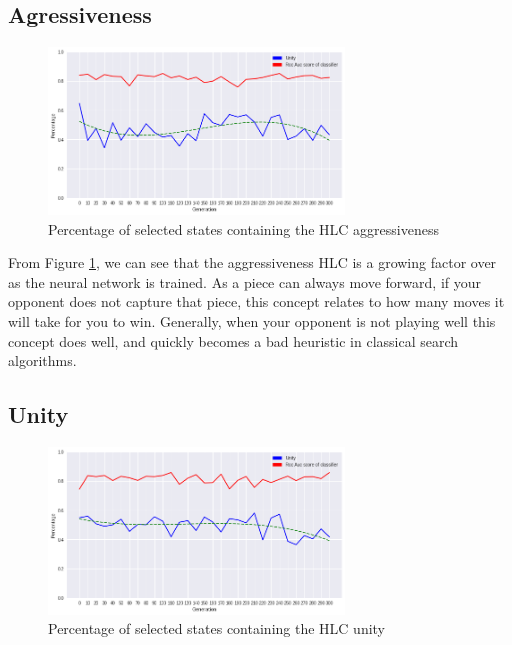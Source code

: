 \subsection{Agressiveness}

\begin{figure}[h]
    \centering
    \includegraphics[width=0.7\textwidth]{graphics/most_advanced_trend.png}
    \caption{Percentage of selected states containing the HLC aggressiveness}
    \label{fig:aggressiveness}
\end{figure}

From Figure \ref{fig:aggressiveness}, we can see that the aggressiveness HLC is a growing factor over as the neural network is trained. As a piece can always move forward, if your opponent does not capture that piece, this concept relates to how many moves it will take for you to win. Generally, when your opponent is not playing well this concept does well, and quickly becomes a bad heuristic in classical search algorithms.

\subsection{Unity}

\begin{figure}[h]
    \centering
    \includegraphics[width=0.7\textwidth]{graphics/unity_trend.png}
    \caption{Percentage of selected states containing the HLC unity}
    \label{fig:unity}
\end{figure}


